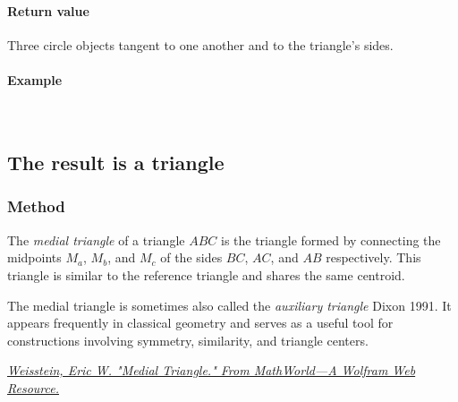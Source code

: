 \medskip
\noindent
\paragraph*{Return value} Three circle objects tangent to one another and to the triangle’s sides.

\medskip
\noindent
\paragraph*{Example}\mbox{}\\

\medskip
\begin{tkzexample}[latex=.45\textwidth]
\begin{center}
\end{center}
\end{tkzexample}




\subsection{The result is a triangle}
\subsubsection{Method } %
\label{ssub:method_triangle_medial}

The \emph{medial triangle} of a triangle $ABC$ is the triangle formed by connecting the midpoints $M_a$, $M_b$, and $M_c$ of the sides $BC$, $AC$, and $AB$ respectively. This triangle is similar to the reference triangle and shares the same centroid.

The medial triangle is sometimes also called the \emph{auxiliary triangle} Dixon 1991. It appears frequently in classical geometry and serves as a useful tool for constructions involving symmetry, similarity, and triangle centers.
\begin{flushright}
  \small
\href{https://mathworld.wolfram.com/MedialTriangle.html}
{\textit{Weisstein, Eric W. "Medial Triangle." From MathWorld—A Wolfram Web Resource.}}
\end{flushright}

